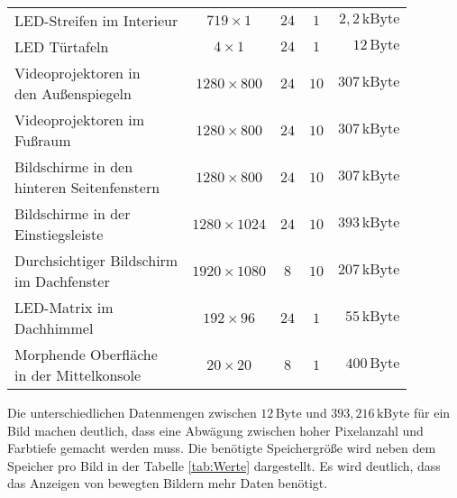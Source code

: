 \begin{table}[hbt]
\begin{tabular}{l|cccr}
		\parbox[t]{0.3\linewidth}{\RaggedRight LED-Streifen im Interieur} & $ 719 \times 1 $ & $ 24 $ & $ 1 $ & $ 2,2\,\mathrm{kByte} $ \\
		\parbox[t]{0.3\linewidth}{\RaggedRight LED Türtafeln} & $ 4 \times 1 $ & $ 24 $ & $ 1 $ &  $ 12\,\mathrm{Byte} $ \\
		\parbox[t]{0.3\linewidth}{\RaggedRight Videoprojektoren in\\den Außenspiegeln} & $ 1280 \times 800 $ & $ 24 $ & $ 10 $ &   $ 307\,\mathrm{kByte} $ \\ 
		\parbox[t]{0.3\linewidth}{\RaggedRight Videoprojektoren im\\ Fußraum} & $ 1280 \times 800 $ & $ 24 $ & $ 10 $ & $ 307\,\mathrm{kByte} $ \\
		\parbox[t]{0.3\linewidth}{\RaggedRight Bildschirme in den\\hinteren Seitenfenstern} & $ 1280 \times 800 $ & $ 24 $ & $ 10 $ & $ 307\,\mathrm{kByte} $ \\
		\parbox[t]{0.3\linewidth}{\RaggedRight Bildschirme in der\\ Einstiegsleiste} &  $ 1280 \times 1024 $ & $ 24 $ & $ 10 $ & $ 393\,\mathrm{kByte} $ \\
		\parbox[t]{0.3\linewidth}{\RaggedRight Durchsichtiger Bildschirm\\im Dachfenster} & $ 1920 \times 1080 $ & $ 8 $ & $ 10 $ & $ 207\,\mathrm{kByte} $ \\
		\parbox[t]{0.3\linewidth}{\RaggedRight LED-Matrix im\\ Dachhimmel} & $ 192 \times 96 $ & $ 24 $ & $ 1 $ & $ 55\,\mathrm{kByte} $ \\
		\parbox[t]{0.3\linewidth}{\RaggedRight Morphende Oberfläche\\in der Mittelkonsole} & $ 20 \times 20 $ & $ 8 $ & $ 1 $ & $ 400\,\mathrm{Byte} $ \\
	\end{tabular} 
\end{table}
Die unterschiedlichen Datenmengen zwischen $ 12\,\mathrm{Byte} $ und $ 393,216\,\mathrm{kByte} $ für ein Bild machen deutlich, dass eine Abwägung zwischen hoher Pixelanzahl und Farbtiefe gemacht werden muss. Die benötigte Speichergröße wird neben dem Speicher pro Bild in der Tabelle \ref{tab:Werte} dargestellt. Es wird deutlich, dass das Anzeigen von bewegten Bildern mehr Daten benötigt.
